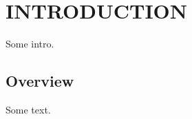 \chapter{INTRODUCTION\label{chapter:introduction}}

Some intro.

\section{Overview\label{sec:overview}}

Some text.